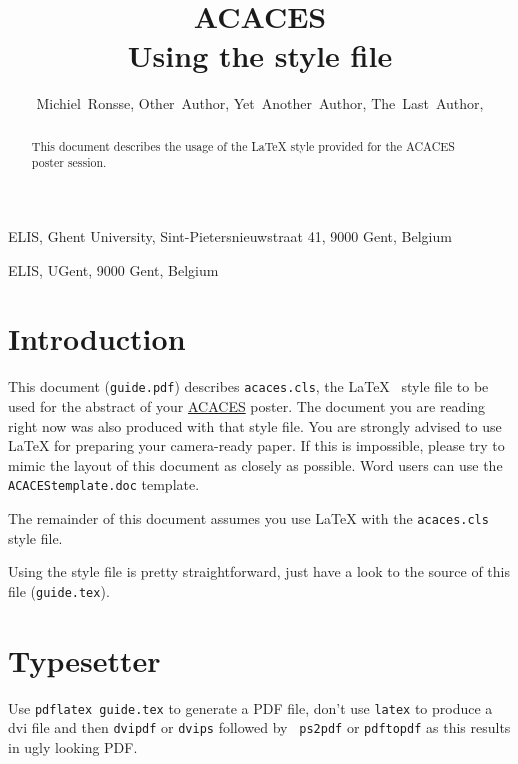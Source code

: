 \documentclass{acaces}
\begin{document}
\title{ACACES\\
    Using the style file
}

\author{
    Michiel~Ronsse,
    Other~Author\comma{},
    Yet~Another~Author,
    The~Last~Author,
}

\address{1}{
    ELIS,
    Ghent University,
    Sint-Pietersnieuwstraat 41,
    9000 Gent,
    Belgium
}

\address{2}{
    ELIS,
    UGent,
    9000 Gent,
    Belgium
}


\pagestyle{empty}


\begin{abstract}
    This document describes the usage of the \LaTeX{} style provided
    for the ACACES poster session.
\end{abstract}


\section{Introduction}
This document ({\tt guide.pdf}) describes {\tt acaces.cls}, the
\LaTeX~\cite{latex} style file to be used for the abstract of your 
\href{http://www.hipeac.net/acaces2006/}{ACACES} poster. The document
you are reading right now was also produced with that style file.
You are strongly advised to use \LaTeX{} for preparing your camera-ready paper.
If this is impossible, please try to mimic the layout of this document as
closely as possible. Word users can use the {\tt
        ACACEStemplate.doc} template.

The remainder of this document assumes you use \LaTeX{} with the
    {\tt acaces.cls} style file.

Using the style file is pretty straightforward, just have a look to the source of this file 
({\tt guide.tex}).


\section{Typesetter}

Use {\tt pdflatex guide.tex} to generate a PDF file, don't use {\tt latex} to
produce a dvi file and then {\tt dvipdf} or {\tt dvips} followed by {\tt
        ps2pdf} or {\tt pdftopdf} as this results in ugly looking PDF.
\end{document}
